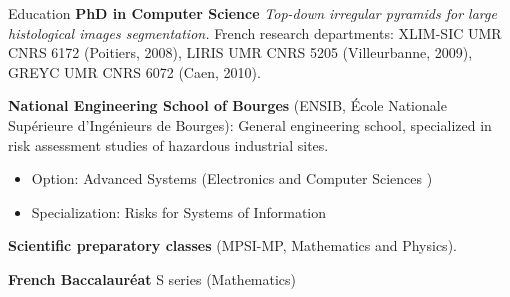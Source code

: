 \begin{rubric}{Education}
  \textbf{PhD in Computer Science}
  \textit{Top-down irregular pyramids for large histological images segmentation.}
  French research departments: XLIM-SIC UMR CNRS 6172 (Poitiers, 2008), LIRIS UMR CNRS 5205 (Villeurbanne, 2009), GREYC UMR CNRS 6072 (Caen, 2010).

  \textbf{National Engineering School of Bourges} (ENSIB, École Nationale Supérieure d'Ingénieurs
  de Bourges): General engineering school, specialized in risk assessment studies of hazardous
  industrial sites.
  \begin{itemize}
  \item Option: Advanced Systems (Electronics and Computer Sciences )
  \item Specialization: Risks for Systems of Information
  \end{itemize}

  \textbf{Scientific preparatory classes} (MPSI-MP, Mathematics and Physics).

  \textbf{French Baccalauréat} S series (Mathematics)
\end{rubric}
